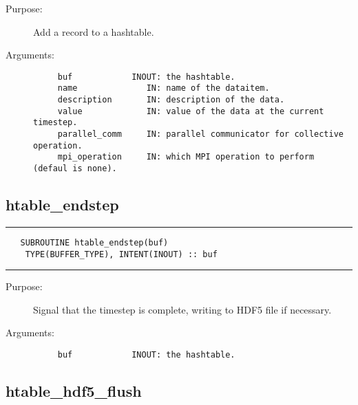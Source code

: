 \documentclass[a4paper]{article}
\begin{document}
\begin{description}
\item[Purpose:] \mbox{}

Add a record to a hashtable.

\item[Arguments:] \mbox{}

\begin{verbatim}
     buf            INOUT: the hashtable.
     name              IN: name of the dataitem.
     description       IN: description of the data.
     value             IN: value of the data at the current timestep.
     parallel_comm     IN: parallel communicator for collective operation.
     mpi_operation     IN: which MPI operation to perform (defaul is none).

\end{verbatim}


\end{description}





\subsection{htable\_endstep}

\par
\addvspace{\medskipamount}
\nopagebreak\hrule
\begin{verbatim}
   SUBROUTINE htable_endstep(buf)
    TYPE(BUFFER_TYPE), INTENT(INOUT) :: buf
\end{verbatim}
\nopagebreak\hrule
\addvspace{\medskipamount}

\begin{description}
\item[Purpose:] \mbox{}

Signal that the timestep is complete, writing to HDF5 file if necessary.

\item[Arguments:] \mbox{}

\begin{verbatim}
     buf            INOUT: the hashtable.

\end{verbatim}


\end{description}





\subsection{htable\_hdf5\_flush}
\end{document}
